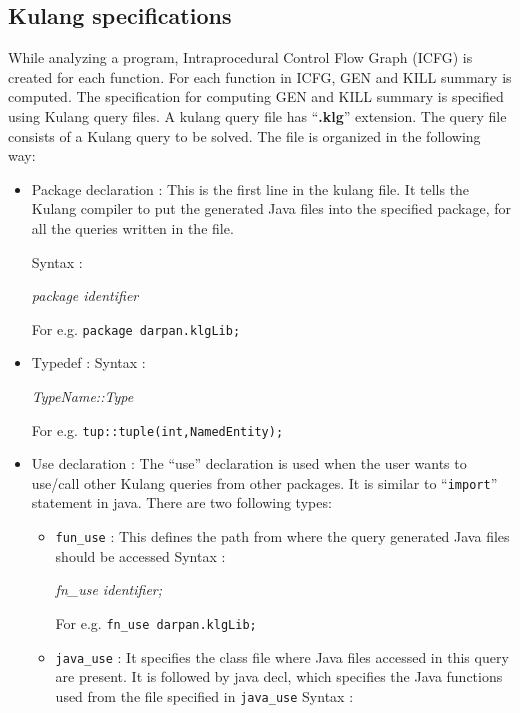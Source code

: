 \documentclass[11pt,a4paper,openright]{report}
\begin{document}
\subsection{Kulang specifications}
While analyzing a program, Intraprocedural Control Flow Graph (ICFG) is created for each function. For each function in ICFG, GEN and KILL summary is computed.
The specification for computing GEN and KILL summary is specified using Kulang query files. A kulang query file has ``\textbf{.klg}'' extension.
The query file consists of a Kulang query to be solved. The file is organized in the following way:
\begin{itemize}
 \item Package declaration : This is the first line in the kulang file. It tells the Kulang compiler to put the generated Java files into the specified package, for
 all the queries written in the file.

 Syntax :
 
\hspace{15mm}\textit{package identifier}

\hspace{15mm} For e.g. \texttt{package darpan.klgLib;}

\item Typedef :\newline 
Syntax : 

\hspace{15mm}\textit{TypeName::Type}

\hspace{15mm}For e.g. \texttt{tup::tuple(int,NamedEntity);}

\item Use declaration : The ``use'' declaration is used when the user wants to use/call other Kulang queries from other packages.
It is similar to ``\texttt{import}'' statement in java. There are two following types:
	\begin{itemize}
	\item \texttt{fun\_use} : This defines the path from where the query generated Java files should be accessed
			  \newline Syntax : 
			  
					    \hspace{15mm} \textit{fn\_use identifier;}
					    
					    \hspace{15mm} For e.g. \texttt{fn\_use darpan.klgLib;}
	\item \texttt{java\_use} : It specifies the class file where Java files accessed in this query are present. It is followed by java
	decl, which specifies the Java functions used from the file specified in \texttt{java\_use}
	 \newline Syntax : 
			  

\end{itemize}
\end{itemize}
\end{document}
